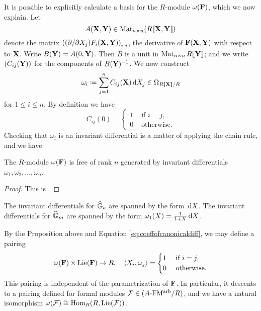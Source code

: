 It is possible to explicitly calculate a basis for the $R$-module
$\omega(\mathbf{F})$, which we now explain. Let 
$$A(\mathbf{X}, \mathbf{Y}) \in \operatorname{Mat}_{n \times n} (R\llbracket \mathbf{X}, \mathbf{Y} \rrbracket)$$ 
denote the matrix $\left((\partial/\partial X_j)F_i (\mathbf{X},\mathbf{Y})\right)_{i,j}$,
the derivative of $\mathbf{F}(\mathbf{X},\mathbf{Y})$ with respect to $\mathbf{X}$. Write 
$B(\mathbf{Y}) = A(0,\mathbf{Y})$. Then $B$ is a unit in $\operatorname{Mat}_{n \times n} R\llbracket \mathbf{Y} \rrbracket$; 
and we write $(C_{ij}(\mathbf{Y}))$ for the components of 
$B(\mathbf{Y})^{-1}$. We now construct 
$$\omega_{i} \coloneqq \sum_{j=1}^n C_{ij}(\mathbf{X}) \, \mathrm{d} X_j \in \Omega_{R\llbracket \mathbf{X} \rrbracket/R}$$ 
for $1 \leq i \leq n$. By definition we have 
\begin{equation}\label{eq:coeffofcanonicaldiff}
  C_{ij}(0) = \begin{cases}
    1 &\text{ if }i = j,\\
    0 &\text{ otherwise.}
  \end{cases}
\end{equation}
Checking that $\omega_{i}$ is an invariant differential is a matter of
applying the chain rule, and we have
\begin{prop}
    The $R$-module $\omega(\mathbf{F})$ is free of rank $n$ generated by invariant differentials
    $\omega_{1}, \omega_{2}, \dots, \omega_{n}$.
\begin{proof}
  This is \cite[Proposition 1.1]{1970HondaFormalGroups}. 
\end{proof}
\end{prop}
\begin{xpl}
  The invariant differentials for $\widehat{\mathbb{G}}_a$ are spanned by the form $\, \mathrm{d} X$. 
  The invariant differentials for $\widehat{\mathbb{G}}_m$ are spanned by the form 
  $\omega_1(X) = \frac 1{1+X} \, \mathrm{d} X$.
\end{xpl}
By the Proposition above and Equation \eqref{eq:coeffofcanonicaldiff}, we may
define a pairing
\begin{equation*}
  \omega(\mathbf{F}) \times \operatorname{Lie}(\mathbf{F}) \to R, \quad \langle X_i, \omega_j \rangle =
  \begin{cases}
    1 &\text{ if } i = j,\\
    0 &\text{ otherwise.}
  \end{cases}
\end{equation*}
This pairing is independent of the parametrization of $\mathbf{F}$. In particular, it
descents to a pairing defined for formal modules $\mathcal{F} \in {({A}\text-\mathrm{FM^{arb}}/{R})}$, and
we have a natural isomorphism $\omega(\mathcal{F}) \cong \operatorname{Hom}_R(R, \operatorname{Lie}(\mathcal{F}))$.

